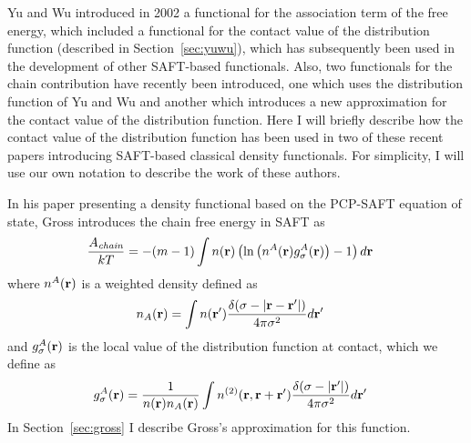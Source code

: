Yu and Wu introduced in 2002 a functional for the association term of
the free energy, which included a functional for the contact value of
the distribution function (described in
Section~\ref{sec:yuwu})\cite{yu2002fmt-dft-inhomogeneous-associating},
which has subsequently been used in the development of other
SAFT-based functionals\cite{fu2005vapor-liquid-dft, bryk2006density}.
Also, two functionals for the chain contribution have recently been
introduced, one which uses the
distribution function of Yu and Wu\cite{bryk2006density} and another which
introduces a new approximation for the contact value of the
distribution function\cite{gross2009density}.
Here I will briefly describe how the contact value of the distribution
function has been used in two of these recent papers introducing
SAFT-based classical density functionals.  For simplicity, I will use
our own notation to describe the work of these authors.

In his paper
presenting a density functional based on the PCP-SAFT equation of
state\cite{gross2009density}, Gross introduces the chain free energy
in SAFT as
\begin{align}
  \frac{A_\textit{chain}}{kT} &= -(m-1) \int n(\textbf{r}) \left(\ln\left(n^A(\textbf{r})
  g_\sigma^A(\textbf{r}) \right)-1\right) d\textbf{r} \label{eq:Achain}
\end{align}
where $n^A(\textbf{r})$ is a weighted density defined as
\begin{align}
  n_A(\textbf{r}) &= \int n(\textbf{r}')
  \frac{\delta(\sigma -|\textbf{r}-\textbf{r}'|)}{4\pi\sigma^2} d\textbf{r}' \label{eq:nA}
\end{align}
and $g_\sigma^A(\textbf{r})$ is the local value of the distribution function
at contact, which we define as
\begin{align}
  g^A_\sigma(\textbf{r}) &= \frac{1}{n(\textbf{r})n_A(\textbf{r})}
  \int n^{(2)}(\textbf{r}, \textbf{r} + \textbf{r}')
  \frac{\delta(\sigma -|\textbf{r}'|)}{4\pi\sigma^2}d\textbf{r}' \label{eq:gA}
\end{align}
In Section~\ref{sec:gross} I describe Gross's approximation for this
function.

